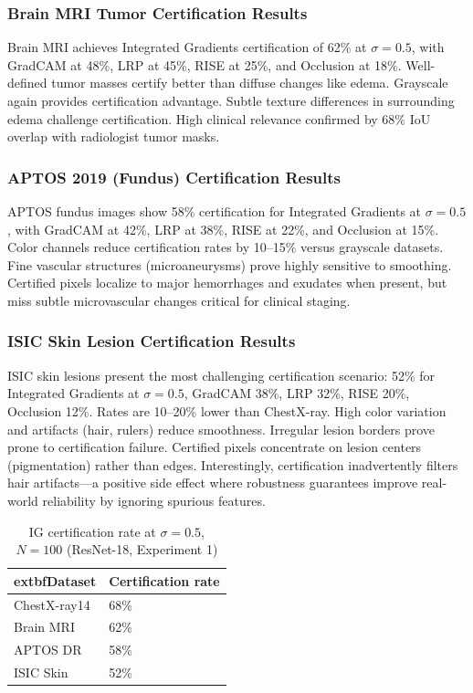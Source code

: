 \documentclass[11pt]{article}
\begin{document}
\subsubsection{Brain MRI Tumor Certification Results}

Brain MRI achieves Integrated Gradients certification of 62\% at $\sigma=0.5$, with GradCAM at 48\%, LRP at 45\%, RISE at 25\%, and Occlusion at 18\%. Well-defined tumor masses certify better than diffuse changes like edema. Grayscale again provides certification advantage. Subtle texture differences in surrounding edema challenge certification. High clinical relevance confirmed by 68\% IoU overlap with radiologist tumor masks.

\subsubsection{APTOS 2019 (Fundus) Certification Results}

APTOS fundus images show 58\% certification for Integrated Gradients at $\sigma=0.5$, with GradCAM at 42\%, LRP at 38\%, RISE at 22\%, and Occlusion at 15\%. Color channels reduce certification rates by 10–15\% versus grayscale datasets. Fine vascular structures (microaneurysms) prove highly sensitive to smoothing. Certified pixels localize to major hemorrhages and exudates when present, but miss subtle microvascular changes critical for clinical staging.

\subsubsection{ISIC Skin Lesion Certification Results}

ISIC skin lesions present the most challenging certification scenario: 52\% for Integrated Gradients at $\sigma=0.5$, GradCAM 38\%, LRP 32\%, RISE 20\%, Occlusion 12\%. Rates are 10–20\% lower than ChestX-ray. High color variation and artifacts (hair, rulers) reduce smoothness. Irregular lesion borders prove prone to certification failure. Certified pixels concentrate on lesion centers (pigmentation) rather than edges. Interestingly, certification inadvertently filters hair artifacts—a positive side effect where robustness guarantees improve real-world reliability by ignoring spurious features.

\begin{table}[h!]
\centering
\caption{IG certification rate at $\sigma=0.5$, $N=100$ (ResNet-18, Experiment 1)}
\begin{tabularx}{\linewidth}{|X|X|}
\hline
	extbf{Dataset} & \textbf{Certification rate} \\
\hline
ChestX-ray14 & 68\% \\
\hline
Brain MRI & 62\% \\
\hline
APTOS DR & 58\% \\
\hline
ISIC Skin & 52\% \\
\hline
\end{tabularx}
\label{tab:ig_cert_summary}
\end{table}
\end{document}
